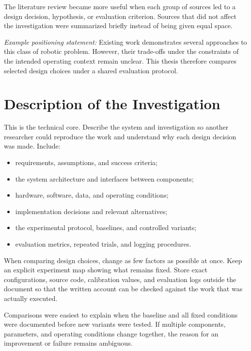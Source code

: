 \documentclass[a4paper,11pt,oneside]{article}
\begin{document}
  \begin{experiencenote}
  The literature review became more useful when each group of sources led to a
  design decision, hypothesis, or evaluation criterion. Sources that did not
  affect the investigation were summarized briefly instead of being given equal
  space.
  \end{experiencenote}

  \textit{Example positioning statement:}
  Existing work demonstrates several approaches to this class of robotic
  problem. However, their trade-offs under the constraints of the intended
  operating context remain unclear. This thesis therefore compares selected
  design choices under a shared evaluation protocol.

  \section{Description of the Investigation}

  \begin{guidance}
  This is the technical core. Describe the system and investigation so another
  researcher could reproduce the work and understand why each design decision
  was made. Include:
  \begin{itemize}
    \item requirements, assumptions, and success criteria;
    \item the system architecture and interfaces between components;
    \item hardware, software, data, and operating conditions;
    \item implementation decisions and relevant alternatives;
    \item the experimental protocol, baselines, and controlled variants;
    \item evaluation metrics, repeated trials, and logging procedures.
  \end{itemize}

  When comparing design choices, change as few factors as possible at once.
  Keep an explicit experiment map showing what remains fixed. Store exact
  configurations, source code, calibration values, and evaluation logs outside
  the document so that the written account can be checked against the work that
  was actually executed.
  \end{guidance}

  \begin{experiencenote}
  Comparisons were easiest to explain when the baseline and all fixed conditions
  were documented before new variants were tested. If multiple components,
  parameters, and operating conditions change together, the reason for an
  improvement or failure remains ambiguous.
  \end{experiencenote}
\end{document}
